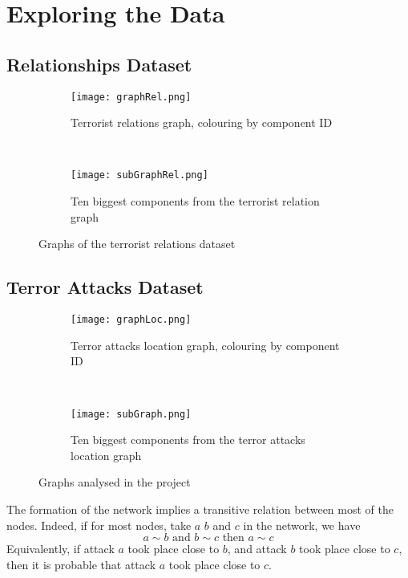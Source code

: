 \section{Exploring the Data}
\label{sec:Exploring the Data}

\subsection{Relationships Dataset}
\label{subsec:Relationships Dataset}

\begin{figure}[H]
\begin{center}
    \begin{subfigure}[b]{0.45\textwidth}
        \texttt{[image: graphRel.png]}
        \caption{Terrorist relations graph, colouring by component ID}
        \label{fig:graphLoc}
    \end{subfigure}
    ~
    \begin{subfigure}[b]{0.45\textwidth}
        \texttt{[image: subGraphRel.png]}
        \caption{Ten biggest components from the terrorist relation graph}
        \label{fig:subGraph}
    \end{subfigure}
\caption{Graphs of the terrorist relations dataset}
\label{fig:graphPlots}
\end{center}
\end{figure}

\subsection{Terror Attacks Dataset}
\label{subsec:Terror Attacks Dataset}

\begin{figure}[H]
\begin{center}
    \begin{subfigure}[b]{0.45\textwidth}
        \texttt{[image: graphLoc.png]}
        \caption{Terror attacks location graph, colouring by component ID}
        \label{fig:graphLoc}
    \end{subfigure}
    ~
    \begin{subfigure}[b]{0.45\textwidth}
        \texttt{[image: subGraph.png]}
        \caption{Ten biggest components from the terror attacks location graph}
        \label{fig:subGraph}
    \end{subfigure}
\caption{Graphs analysed in the project}
\label{fig:graphPlots}
\end{center}
\end{figure}
The formation of the network implies a transitive relation between most of the nodes. Indeed, if for most nodes, take $a$ $b$ and $c$ in the network, we have
\begin{equation}
a \sim b \text{ and } b \sim c \text{ then } a \sim c 
\end{equation}
Equivalently, if attack $a$ took place close to $b$, and attack $b$ took place close to $c$, then it is probable that attack $a$ took place close to $c$.